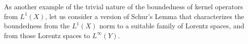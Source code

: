 %
%
%
%
%
%
%

As another example of the trivial nature of the boundedness of kernel operators from $L^1(X)$, let us consider a version of Schur's Lemma that characterizes the boundedness from the $L^1(X)$ norm to a suitable family of Lorentz spaces, and from those Lorentz spaces to $L^\infty(Y)$.

